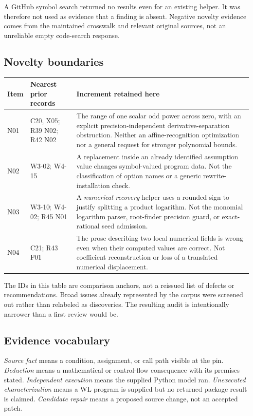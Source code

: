 \documentclass[11pt,letterpaper]{article}
\begin{document}
A GitHub symbol search returned no results even for an existing helper. It was therefore not used as evidence that a finding is absent. Negative novelty evidence comes from the maintained crosswalk and relevant original sources, not an unreliable empty code-search response.

\subsection{Novelty boundaries}

\begin{tabularx}{\textwidth}{@{}P{0.45in}P{1.45in}Y@{}}
\toprule
Item & Nearest prior records & Increment retained here\\\midrule
N01 & C20, X05; R39 N02; R42 N02 & The range of one scalar odd power across zero, with an explicit precision-independent derivative-separation obstruction. Neither an affine-recognition optimization nor a general request for stronger polynomial bounds.\\[5pt]
N02 & W3-02; W4-15 & A replacement inside an already identified assumption value changes symbol-valued program data. Not the classification of option names or a generic rewrite-installation check.\\[5pt]
N03 & W3-10; W4-02; R45 N01 & A \emph{numerical recovery} helper uses a rounded sign to justify splitting a product logarithm. Not the monomial logarithm parser, root-finder precision guard, or exact-rational seed admission.\\[5pt]
N04 & C21; R43 F01 & The prose describing two local numerical fields is wrong even when their computed values are correct. Not coefficient reconstruction or loss of a translated numerical displacement.\\
\bottomrule
\end{tabularx}

The IDs in this table are comparison anchors, not a reissued list of defects or recommendations. Broad issues already represented by the corpus were screened out rather than relabeled as discoveries. The resulting audit is intentionally narrower than a first review would be.

\subsection{Evidence vocabulary}

\emph{Source fact} means a condition, assignment, or call path visible at the pin. \emph{Deduction} means a mathematical or control-flow consequence with its premises stated. \emph{Independent execution} means the supplied Python model ran. \emph{Unexecuted characterization} means a WL program is supplied but no returned package result is claimed. \emph{Candidate repair} means a proposed source change, not an accepted patch.
\end{document}
